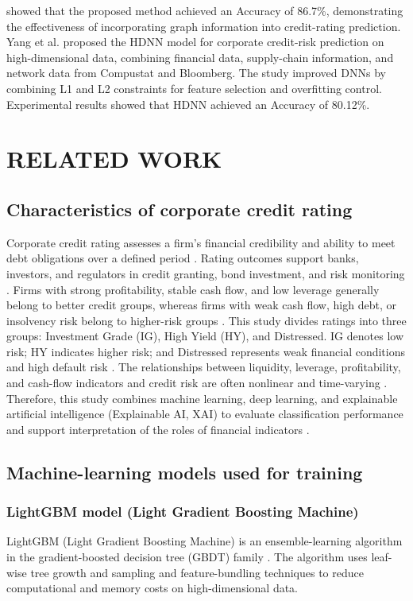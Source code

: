 \documentclass[10pt,twoside]{article}
\begin{document}
showed that the proposed method achieved an Accuracy of 86.7\%, demonstrating the effectiveness of incorporating graph information into credit-rating prediction. Yang et al. \cite{yang_deep_2023} proposed the HDNN model for corporate credit-risk prediction on high-dimensional data, combining financial data, supply-chain information, and network data from Compustat and Bloomberg. The study improved DNNs by combining L1 and L2 constraints for feature selection and overfitting control. Experimental results showed that HDNN achieved an Accuracy of 80.12\%.

\section{RELATED WORK}

\subsection{Characteristics of corporate credit rating}

Corporate credit rating assesses a firm's financial credibility and ability to meet debt obligations over a defined period \cite{phu_nghi_nodate}. Rating outcomes support banks, investors, and regulators in credit granting, bond investment, and risk monitoring \cite{hai_mo_2023}. Firms with strong profitability, stable cash flow, and low leverage generally belong to better credit groups, whereas firms with weak cash flow, high debt, or insolvency risk belong to higher-risk groups \cite{thuy_ung_2023}. This study divides ratings into three groups: Investment Grade (IG), High Yield (HY), and Distressed. IG denotes low risk; HY indicates higher risk; and Distressed represents weak financial conditions and high default risk \cite{hung_xep_2023}. The relationships between liquidity, leverage, profitability, and cash-flow indicators and credit risk are often nonlinear and time-varying \cite{hai_mo_2023}. Therefore, this study combines machine learning, deep learning, and explainable artificial intelligence (Explainable AI, XAI) to evaluate classification performance and support interpretation of the roles of financial indicators \cite{gramegna_shap_2021}.
\subsection{Machine-learning models used for training}

\subsubsection{LightGBM model (Light Gradient Boosting Machine)}
LightGBM (Light Gradient Boosting Machine) is an ensemble-learning algorithm in the gradient-boosted decision tree (GBDT) family \cite{ke_lightgbm_2017}. The algorithm uses leaf-wise tree growth and sampling and feature-bundling techniques to reduce computational and memory costs on high-dimensional data.
\end{document}

